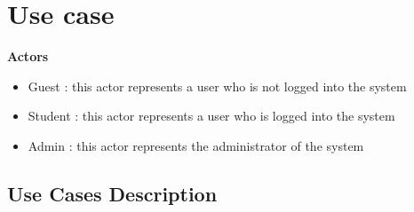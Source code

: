 \documentclass[a4paper, oneside]{article}
\begin{document}
\clearpage

\section{Use case}

\textbf{Actors}
\begin{itemize}
\item{Guest : this actor represents a user who is not logged into the system}
\item{Student : this actor represents a user who is logged into the system}
\item{Admin : this actor represents the administrator of the system}
\end{itemize}

\subsection{Use Cases Description}
\end{document}
